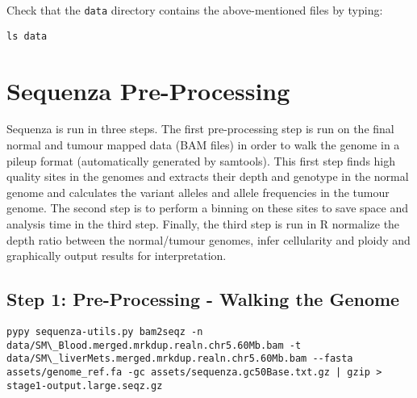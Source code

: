 \begin{steps}
Check that the \texttt{data} directory contains the above-mentioned files by typing:
\begin{lstlisting}
ls data
\end{lstlisting}
\end{steps}



\section{Sequenza Pre-Processing}

Sequenza is run in three steps. The first pre-processing step is run on the final normal and tumour mapped data (BAM files) in order to walk the genome in a pileup format (automatically generated by samtools). This first step finds high quality sites in the genomes and extracts their depth and genotype in the normal genome and calculates the variant alleles and allele frequencies in the tumour genome. The second step is to perform a binning on these sites to save space and analysis time in the third step. Finally, the third step is run in R normalize the depth ratio between the normal/tumour genomes, infer cellularity and ploidy and graphically output results for interpretation.

\subsection{Step 1: Pre-Processing - Walking the Genome}

\begin{steps}
\begin{lstlisting}
pypy sequenza-utils.py bam2seqz -n data/SM\_Blood.merged.mrkdup.realn.chr5.60Mb.bam -t data/SM\_liverMets.merged.mrkdup.realn.chr5.60Mb.bam --fasta assets/genome_ref.fa -gc assets/sequenza.gc50Base.txt.gz | gzip > stage1-output.large.seqz.gz
\end{lstlisting}
\end{steps}

